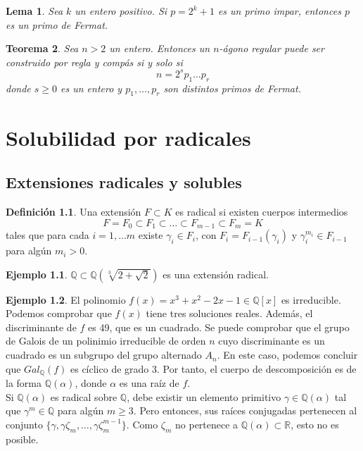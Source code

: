\documentclass{report}
\newtheorem{theorem}{Teorema}[chapter]
\newtheorem{lemma}[theorem]{Lema}
\theoremstyle{remark}
\theoremstyle{definition}
\newtheorem{definition}{Definición}[chapter]
\theoremstyle{definition}
\theoremstyle{definition}
\newtheorem*{example}{Ejemplo}
\begin{document}
\begin{lemma}
    Sea $k$ un entero positivo. Si $p = 2^k+1$ es un primo impar, entonces $p$ es un primo de Fermat.
\end{lemma}

\begin{theorem}
    Sea $n > 2$ un entero. Entonces un $n$-ágono regular puede ser construido por regla y compás si y solo si
    $$n = 2^s p_1 \dots p_r$$
    donde $s \geq 0$ es un entero y $p_1, \dots, p_r$ son distintos primos de Fermat.
\end{theorem}

\chapter{Solubilidad por radicales}
\section{Extensiones radicales y solubles}

\begin{definition}
    Una extensión $F \subset K$ es radical si existen cuerpos intermedios
    $$F = F_0 \subset F_1 \subset \dots \subset F_{m-1} \subset F_m = K$$
    tales que para cada $i = 1, \dots m$ existe $\gamma_i \in F_i$, con $F_i = F_{i-1}(\gamma_i)$ y $\gamma^{m_i}_i \in F_{i-1}$ para algún $m_i > 0$.
\end{definition}

\begin{example}
    $\mathbb{Q} \subset \mathbb{Q}(\sqrt[3]{2+\sqrt{2}})$ es una extensión radical.
\end{example}

\begin{example}
    El polinomio $f(x) = x^3+x^2-2x-1 \in \mathbb{Q}[x]$ es irreducible.
    Podemos comprobar que $f(x)$ tiene tres soluciones reales. Además, el discriminante de $f$ es 49, que es un cuadrado.
    Se puede comprobar que el grupo de Galois de un polinimio irreducible de orden $n$ cuyo discriminante es un cuadrado es un subgrupo del grupo alternado $A_n$.
    En este caso, podemos concluir que $Gal_\mathbb{Q}(f)$ es cíclico de grado 3.
    Por tanto, el cuerpo de descomposición es de la forma $\mathbb{Q}(\alpha)$, donde $\alpha$ es una raíz de $f$.\\
    Si $\mathbb{Q}(\alpha)$ es radical sobre $\mathbb{Q}$, debe existir un elemento primitivo $\gamma \in \mathbb{Q}(\alpha)$ tal que $\gamma^m \in \mathbb{Q}$ para algún $m \geq 3$.
    Pero entonces, sus raíces conjugadas pertenecen al conjunto $\{ \gamma, \gamma\zeta_m, \dots, \gamma\zeta^{m-1}_m \}$.
    Como $\zeta_m$ no pertenece a $\mathbb{Q}(\alpha) \subset \mathbb{R}$, esto no es posible.
\end{example}
\end{document}
